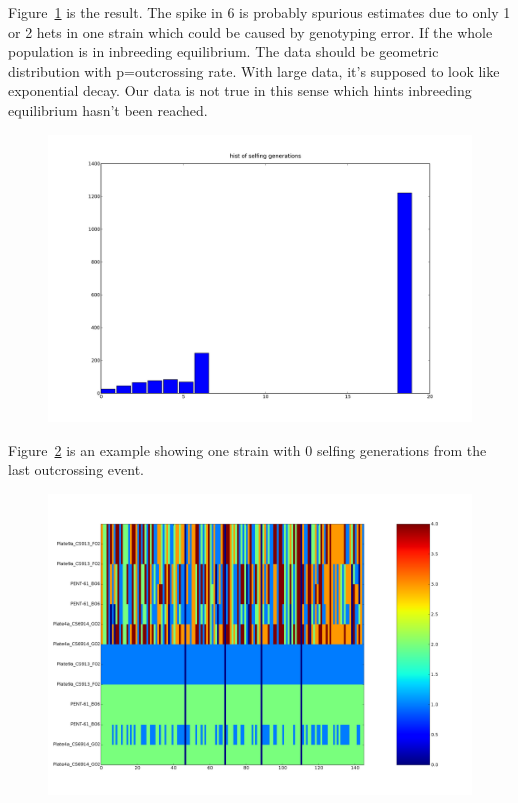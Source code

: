 \documentclass[a4paper,10pt]{article}
\begin{document}
Figure~\ref{f8} is the result. The spike in 6 is probably spurious estimates due to only 1 or 2 hets in one strain which could be caused by genotyping error. If the whole population is in inbreeding equilibrium. The data should be geometric distribution with p=outcrossing rate. With large data, it's supposed to look like exponential decay. Our data is not true in this sense which hints inbreeding equilibrium hasn't been reached.

\begin{figure}
\includegraphics[width=1\textwidth]{figures/justin_data_y_b_filtered_estimate_selfing_generation_hist.png}
\caption{}\label{f8}
\end{figure}

Figure~\ref{f9} is an example showing one strain with 0 selfing generations from the last outcrossing event.

\begin{figure}
\includegraphics[width=1\textwidth]{figures/trio1.png}
\caption{}\label{f9}
\end{figure}
\end{document}
